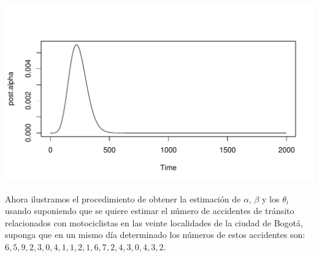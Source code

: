\begin{knitrout}
\begin{kframe}\begin{alltt}
\end{alltt}
\end{kframe}
\includegraphics[width=\maxwidth]{figure/unnamed-chunk-13-3} 

\end{knitrout}
Ahora ilustramos el procedimiento de obtener la estimación de $\alpha$, $\beta$ y los $\theta_i$ usando suponiendo que se quiere estimar el número de accidentes de tránsito relacionados con motociclistas en las veinte localidades de la ciudad de Bogotá, suponga que en un mismo día determinado los números de estos accidentes son: $6, 5, 9, 2, 3, 0, 4, 1, 1, 2, 1, 6, 7, 2, 4, 3, 0, 4, 3, 2$.
